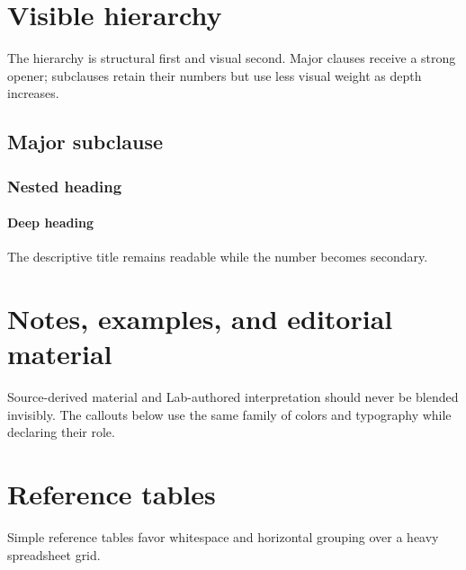 \documentclass{requirements-lab}
\begin{document}
\clearpage
\section{Visible hierarchy}
\RLAccentRule
\RLBodyFont
The hierarchy is structural first and visual second. Major clauses receive a strong opener; subclauses retain their numbers but use less visual weight as depth increases.

\subsection{Major subclause}
\subsubsection{Nested heading}
\paragraph{Deep heading} The descriptive title remains readable while the number becomes secondary.


\section{Notes, examples, and editorial material}
\RLAccentRule
\RLBodyFont
Source-derived material and Lab-authored interpretation should never be blended invisibly. The callouts below use the same family of colors and typography while declaring their role.





\clearpage
\section{Reference tables}
\RLAccentRule
\RLBodyFont
Simple reference tables favor whitespace and horizontal grouping over a heavy spreadsheet grid.
\end{document}
